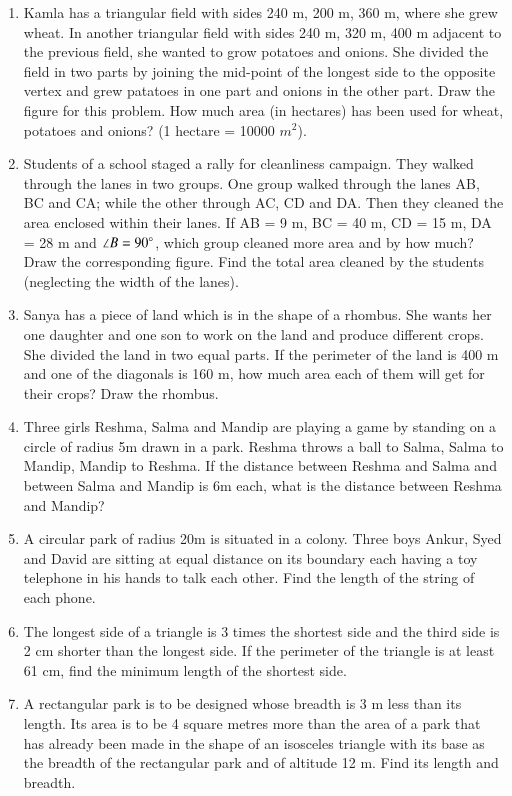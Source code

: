 \begin{enumerate}[label=\thesection.\arabic*.,ref=\thesection.\theenumi]
\item Kamla has a triangular field with sides 240 m, 200 m, 360 m, where she grew wheat. In another triangular field with sides 240 m, 320 m, 400 m adjacent to the previous field, she wanted to grow potatoes and onions. She divided the field in two parts by joining the mid-point of the longest side to the opposite vertex and grew patatoes in one part and onions in the other part. Draw the figure for this problem.  How much area (in hectares) has been used for wheat, potatoes and onions? (1 hectare = 10000 $m^2$).
\item Students of a school staged a rally for cleanliness campaign. They walked through the lanes in two groups. One group walked through the lanes AB, BC and CA; while the other through AC, CD and DA. Then they cleaned the area enclosed within their lanes. If AB = 9 m, BC = 40 m, CD = 15 m, DA = 28 m and $\angle B = 90\degree$, which group cleaned more area and by how much? Draw the corresponding figure.  Find the total area cleaned by the students (neglecting the width of the lanes). 
%
\item Sanya has a piece of land which is in the shape of a rhombus. She wants her one daughter and one son to work on the land and produce different crops. She divided the land in two equal parts. If the perimeter of the land is 400 m and one of the diagonals is 160 m, how much area each of them will get for their crops? Draw the rhombus.
%
\item Three girls Reshma, Salma and Mandip are playing a game by standing on a circle of radius 5m drawn in a park. Reshma throws a ball to Salma, Salma to Mandip, Mandip to Reshma. If the distance between Reshma and Salma and between Salma and Mandip is 6m each, what is the distance between Reshma and Mandip?
\item A circular park of radius 20m is situated in a colony. Three boys Ankur, Syed and David are sitting at equal distance on its boundary each having a toy telephone in his hands to talk each other. Find the length of the string of each phone.
    \item The longest side of a triangle is 3 times the shortest side and the third side is 2 cm shorter than the longest side. If the perimeter of the triangle is at least 61 cm, find the minimum length of the shortest side.
\item A rectangular park is to be designed whose breadth is 3 m less than its length. Its area is to be 4 square metres more than the area of a park that has already been made in the shape of an isosceles triangle with its base as the breadth of the rectangular park and of altitude 12 m. Find its length and breadth.

\end{enumerate}
